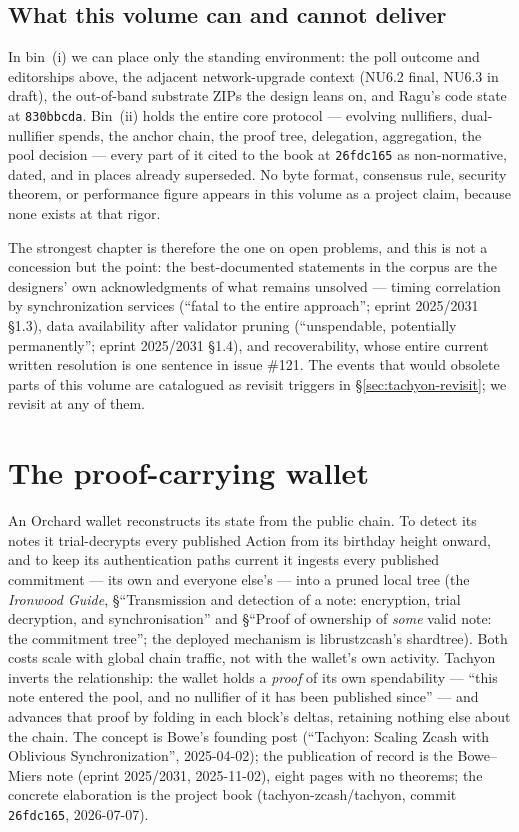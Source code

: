 \documentclass[11pt,a4paper]{article}
\theoremstyle{definition}
\begin{document}
\subsection{What this volume can and cannot deliver}\label{sec:tachyon-expect}

In bin~(i) we can place only the standing environment: the poll outcome and
editorships above,
the adjacent network-upgrade context (NU6.2 final, NU6.3 in draft), the
out-of-band substrate ZIPs the design leans on, and Ragu's code state at
\texttt{830bbcda}. Bin~(ii) holds the entire core protocol --- evolving
nullifiers, dual-nullifier spends, the anchor chain, the proof tree,
delegation, aggregation, the pool decision --- every part of it cited to the
book at \texttt{26fdc165} as non-normative, dated, and in places already
superseded. No byte format, consensus rule, security theorem, or performance
figure appears in this volume as a project claim, because none exists at that
rigor.

The strongest chapter is therefore the one on open problems, and this is not a
concession but the point: the best-documented statements in the corpus are the
designers' own acknowledgments of what remains unsolved --- timing correlation
by synchronization services (``fatal to the entire approach''; eprint
2025/2031 \S1.3), data availability after validator pruning (``unspendable,
potentially permanently''; eprint 2025/2031 \S1.4), and recoverability, whose
entire current written resolution is one sentence in issue \#121. The events
that would obsolete parts of this volume are catalogued as revisit triggers
in \S\ref{sec:tachyon-revisit}; we revisit at any of them.

\section{The proof-carrying wallet}\label{sec:tachyon-architecture}

An Orchard wallet reconstructs its state from the public chain. To detect its
notes it trial-decrypts every published Action from its birthday height
onward, and to keep its authentication paths current it ingests every
published commitment --- its own and everyone else's --- into a pruned local
tree (the \emph{Ironwood Guide}, \S``Transmission and detection of a note:
encryption, trial decryption, and synchronisation'' and \S``Proof of
ownership of \emph{some} valid note: the commitment tree''; the deployed
mechanism is librustzcash's \textsf{shardtree}). Both costs scale with global
chain traffic, not with the wallet's own activity. Tachyon inverts the
relationship: the wallet holds a \emph{proof} of its own spendability ---
``this note entered the pool, and no nullifier of it has been published
since'' --- and advances that proof by folding in each block's deltas,
retaining nothing else about the chain. The concept is Bowe's founding post
(``Tachyon: Scaling Zcash with Oblivious Synchronization'', 2025-04-02); the
publication of record is the Bowe--Miers note (eprint 2025/2031, 2025-11-02),
eight pages with no theorems; the concrete elaboration is the project book
(tachyon-zcash/tachyon, commit \texttt{26fdc165}, 2026-07-07).
\end{document}
